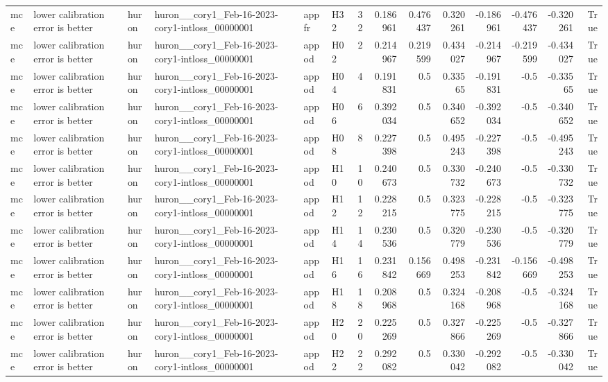 \begin{longtable}{llllllrrrrrrrr}
mce & lower calibration error is better & huron & huron\_\_cory1\_Feb-16-2023-cory1-intloss\_00000001 & appfr & H32 & 32 & 0.186961 & 0.476437 & 0.320261 & -0.186961 & -0.476437 & -0.320261 & True \\
mce & lower calibration error is better & huron & huron\_\_cory1\_Feb-16-2023-cory1-intloss\_00000001 & appod & H02 & 2 & 0.214967 & 0.219599 & 0.434027 & -0.214967 & -0.219599 & -0.434027 & True \\
mce & lower calibration error is better & huron & huron\_\_cory1\_Feb-16-2023-cory1-intloss\_00000001 & appod & H04 & 4 & 0.191831 & 0.5 & 0.33565 & -0.191831 & -0.5 & -0.33565 & True \\
mce & lower calibration error is better & huron & huron\_\_cory1\_Feb-16-2023-cory1-intloss\_00000001 & appod & H06 & 6 & 0.392034 & 0.5 & 0.340652 & -0.392034 & -0.5 & -0.340652 & True \\
mce & lower calibration error is better & huron & huron\_\_cory1\_Feb-16-2023-cory1-intloss\_00000001 & appod & H08 & 8 & 0.227398 & 0.5 & 0.495243 & -0.227398 & -0.5 & -0.495243 & True \\
mce & lower calibration error is better & huron & huron\_\_cory1\_Feb-16-2023-cory1-intloss\_00000001 & appod & H10 & 10 & 0.240673 & 0.5 & 0.330732 & -0.240673 & -0.5 & -0.330732 & True \\
mce & lower calibration error is better & huron & huron\_\_cory1\_Feb-16-2023-cory1-intloss\_00000001 & appod & H12 & 12 & 0.228215 & 0.5 & 0.323775 & -0.228215 & -0.5 & -0.323775 & True \\
mce & lower calibration error is better & huron & huron\_\_cory1\_Feb-16-2023-cory1-intloss\_00000001 & appod & H14 & 14 & 0.230536 & 0.5 & 0.320779 & -0.230536 & -0.5 & -0.320779 & True \\
mce & lower calibration error is better & huron & huron\_\_cory1\_Feb-16-2023-cory1-intloss\_00000001 & appod & H16 & 16 & 0.231842 & 0.156669 & 0.498253 & -0.231842 & -0.156669 & -0.498253 & True \\
mce & lower calibration error is better & huron & huron\_\_cory1\_Feb-16-2023-cory1-intloss\_00000001 & appod & H18 & 18 & 0.208968 & 0.5 & 0.324168 & -0.208968 & -0.5 & -0.324168 & True \\
mce & lower calibration error is better & huron & huron\_\_cory1\_Feb-16-2023-cory1-intloss\_00000001 & appod & H20 & 20 & 0.225269 & 0.5 & 0.327866 & -0.225269 & -0.5 & -0.327866 & True \\
mce & lower calibration error is better & huron & huron\_\_cory1\_Feb-16-2023-cory1-intloss\_00000001 & appod & H22 & 22 & 0.292082 & 0.5 & 0.330042 & -0.292082 & -0.5 & -0.330042 & True \\

\end{longtable}
